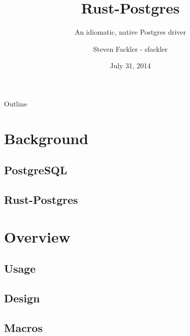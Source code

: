 \documentclass{beamer}
\title{Rust-Postgres}
\subtitle{An idiomatic, native Postgres driver}
\author[sfackler]{Steven Fackler - sfackler}
\date{July 31, 2014}
\begin{document}
\begin{frame}
\titlepage
\end{frame}

\begin{frame}{Outline}
    \tableofcontents
\end{frame}

\section{Background}
\subsection{PostgreSQL}
\subsection{Rust-Postgres}

\section{Overview}
\subsection{Usage}
\subsection{Design}
\subsection{Macros}



\begin{frame}
\end{frame}
\end{document}
